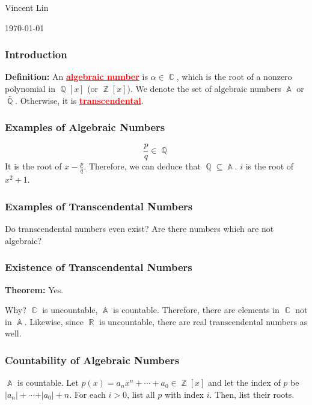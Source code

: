 \documentclass{beamer}
\newcommand{\vocab}[1]{\underline{\textbf{\textcolor{red}{#1}}}}
\DeclareMathOperator{\A}{\mathbb{A}}
\DeclareMathOperator{\C}{\mathbb{C}}
\DeclareMathOperator{\Q}{\mathbb{Q}}
\DeclareMathOperator{\R}{\mathbb{R}}
\DeclareMathOperator{\Z}{\mathbb{Z}}
\begin{document}
    \begin{frame}
        \begin{center}
            {\bfseries\huge{}} \par
        Vincent Lin \par
        \today
        \end{center}
    \end{frame}


    \begin{frame}
        \frametitle{Introduction}
    \begin{mybox}
        \textbf{Definition:} An \vocab{algebraic number} is $\alpha \in \C$, which is the root of a nonzero polynomial in $\Q[x]$ (or $\Z[x]$). We denote the set of algebraic numbers $\A$ or $\bar{\Q}$. Otherwise, it is \vocab{transcendental}.
    \end{mybox}
    \end{frame}

   
    \begin{frame}
        \frametitle{Examples of Algebraic Numbers}
        \[\frac{p}{q} \in \Q\]
        It is the root of $x - \frac{p}{q}$. Therefore, we can deduce that $\Q \subseteq \A$.
        $i$ is the root of $x^2 + 1$.
    \end{frame}

  
    \begin{frame}
        \frametitle{Examples of Transcendental Numbers}
        \begin{center}
            Do transcendental numbers even exist? Are there numbers which are not algebraic? 
        \end{center}
    \end{frame}

    \begin{frame}
        \frametitle{Existence of Transcendental Numbers}
        \begin{center}
            \begin{mybox}
                \textbf{Theorem:} Yes.
            \end{mybox}

            Why? $\C$ is uncountable, $\A$ is countable. Therefore, there are elements in $\C$ not in $\A$. Likewise, since $\R$ is uncountable, there are real transcendental numbers as well.
        \end{center}
    \end{frame}
    \begin{frame}
        \frametitle{Countability of Algebraic Numbers}
        \begin{center}
            $\A$ is countable. Let $p(x) = a_{n}x^{n} + \cdots + a_0 \in \Z[x]$ and let the index of $p$ be $\vert a_n \vert + \cdots + \vert a_0 \vert + n$. For each $i > 0$, list all $p$ with index $i$. Then, list their roots. 
        \end{center}
    \end{frame}
\end{document}
